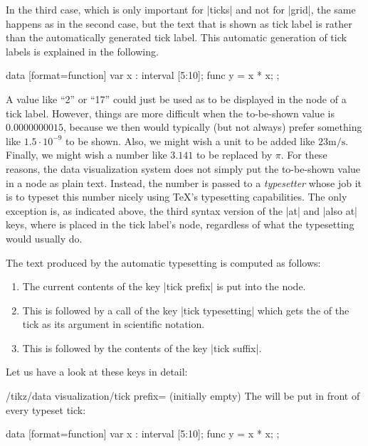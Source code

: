 In the third case, which is only important for |ticks| and not for
|grid|, the same happens as in the second case, but the 
text that is shown as tick label is  rather than the 
automatically generated tick label. This automatic generation of tick
labels is explained in the following.

\begin{codeexample}[]
\tikz \datavisualization
  [scientific clean axes,
   x axis={length=2.5cm, ticks={major at={
         5,
         6 as [style=red],
         7 as [{style=blue, low=-1em}],
         8 as [style=green] $2^3$,
         10 as ten
       }}},
   visualize as line]
  data [format=function] {
    var x : interval [5:10];
    func y = \value x * \value x;
  };
\end{codeexample}


A value like ``2'' or ``17'' could just be used as  to be
displayed in the node of a tick label. However, things are more
difficult when the to-be-shown value is $0.0000000015$, because we
then would typically (but not always) prefer something like $1.5 \cdot
10^{-9}$ to be shown. Also, we might wish a unit to be added like
$23\mathrm{m}/\mathrm{s}$. Finally, we might wish a number like
$3.141$ to be replaced by $\pi$. For these reasons, the data
visualization system does not simply put the to-be-shown value in a
node as plain text. Instead, the number is passed to a
\emph{typesetter} whose job it is to typeset this number nicely using
\TeX's typesetting capabilities. The only exception is, as indicated
above, the third syntax version of the |at| and |also at| keys, where
 is placed in the tick label's node, regardless of what the
typesetting would usually do.

The text produced by the automatic typesetting is computed as follows:
\begin{enumerate}
\item The current contents of the key |tick prefix| is put into the node.
\item This is followed by a call of the key |tick typesetting| which
  gets the  of the tick as its argument in scientific
  notation.
\item This is followed by the contents of the key |tick suffix|.
\end{enumerate}

Let us have a look at these keys in detail:

\begin{key}{/tikz/data visualization/tick prefix=
    (initially \normalfont empty)}
  The  will be put in front of every typeset tick:
\begin{codeexample}[]
\tikz \datavisualization
  [scientific axes, all axes={ticks=few, length=2.5cm},
   x axis={ticks={tick prefix=$\langle$, tick suffix=$]$}},
   visualize as line]
  data [format=function] {
    var x : interval [5:10];
    func y = \value x * \value x;
  };
\end{codeexample}
\end{key}


